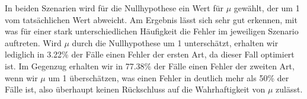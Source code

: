 \documentclass[a4paper]{scrartcl}
\def \blattnr {9}
\begin{document}
\begin{enumerate}[label=\bfseries \blattnr.\arabic*]
      In beiden Szenarien wird für die Nullhypothese ein Wert für $\mu$ gewählt, der 
      um 1 vom tatsächlichen Wert abweicht. Am Ergebnis lässt sich sehr gut erkennen,
      mit was für einer stark unterschiedlichen Häufigkeit die Fehler im jeweiligen 
      Szenario auftreten. Wird $\mu$ durch die Nullhypothese um 1 unterschätzt, 
      erhalten wir lediglich in 3.22\% der Fälle einen Fehler der ersten Art, 
      da dieser Fall optimiert ist. Im Gegenzug erhalten wir in 77.38\% der Fälle 
      einen Fehler der zweiten Art, wenn wir $\mu$ um 1 überschätzen, was einen 
      Fehler in deutlich mehr als 50\% der Fälle ist, also überhaupt keinen Rückschluss auf 
      die Wahrhaftigkeit von $\mu$ zulässt.

\end{enumerate}
\end{document}
